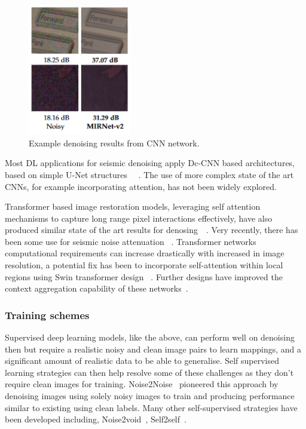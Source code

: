 \documentclass[project-plan]{report-template}
\begin{document}
\begin{figure}[htb]
    \begin{center}
        \includegraphics[width=0.4\textwidth]{latex/figures/noise_removal_ex.png}
    \end{center}
    \caption{\label{fig:example} Example denoising results from CNN network.}
\end{figure}

Most DL applications for seismic denoising apply Dc-CNN based architectures, based on simple U-Net structures ~\cite{li2021seismicdccnn}~\cite{li2021seismicdlsims}. The use of more complex state of the art CNNs, for example incorporating attention, has not been widely explored.

Transformer based image restoration models, leveraging self attention mechanisms to capture long range pixel interactions effectively, have also produced similar state of the art results for denosing~\cite{zamir2021restormer}~\cite{wang2022uformer}. Very recently, there has been some use for seismic noise attenuation ~\cite{lei2024swin}. Transformer networks computational requirements can increase drastically with increased in image resolution, a potential fix has been to incorporate  self-attention within local regions using Swin transformer design ~\cite{wang2022uformer}. Further designs have improved the context aggregation capability of these networks~\cite{zamir2021restormer}.


\subsubsection{Training schemes}
Supervised deep learning models, like the above, can perform well on denoising then but require a realistic noisy and clean image pairs to learn mappings, and a significant amount of realistic data to be able to generalise. Self supervised learning strategies can then help resolve some of these challenges as they don't require clean images for training.
Noise2Noise~\cite{lehtinen2018noise2noise} pioneered this approach by denoising images using solely noisy images to train and producing performance similar to existing using clean labels. Many other self-supervised strategies have been developed including, Noise2void~\cite{krull2019noise2void}, Self2self~\cite{quan2020self2self}.
\end{document}
